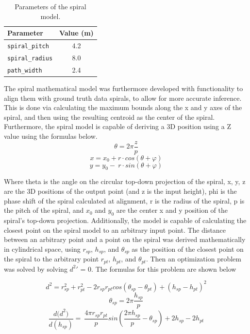 \begin{table}[h!]
\centering
\renewcommand{\arraystretch}{0.9} %
\setlength{\tabcolsep}{6pt}       %
\begin{tabular}{|l|c|}
\hline
\textbf{Parameter}       & \textbf{Value (m)} \\ \hline
\texttt{spiral\_pitch}   & 4.2               \\ \hline
\texttt{spiral\_radius}  & 8.0               \\ \hline
\texttt{path\_width}     & 2.4               \\ \hline
\end{tabular}
\vspace{-0.5em}
\caption{Parameters of the spiral model.}
\label{tab:spiral_params}
\end{table}
\par

The spiral mathematical model was furthermore developed with functionality to align them with ground truth data spirals, to allow for more accurate inference. This is done via calculating the maximum bounds along the x and y axes of the spiral, and then using the resulting centroid as the center of the spiral. Furthermore, the spiral model is capable of deriving a 3D position using a Z value using the formulas below.
$$\theta=2\pi\frac{z}{p}$$
$$x=x_0+r\cdot cos\left(\theta+\varphi\right)$$
$$y=y_0-\ r\cdot sin\left(\theta+\varphi\right)$$ 

Where theta is the angle on the circular top-down projection of the spiral, x, y, z are the 3D positions of the output point (and z is the input height), phi is the phase shift of the spiral calculated at alignment, r is the radius of the spiral, p is the pitch of the spiral, and $x_0$ and $y_0$ are the center x and y position of the spiral's top-down projection.
Additionally, the model is capable of calculating the closest point on the spiral model to an arbitrary input point. The distance between an arbitrary point and a point on the spiral was derived mathematically in cylindrical space, using $r_{sp}$, $h_{sp}$, and $\theta_{sp}$ as the position of the closest point on the spiral to the arbitrary point $r_{pt}$, $h_{pt}$, and $\theta_{pt}$. Then an optimization problem was solved by solving $d^2\prime$ = 0. The formulas for this problem are shown below

$$d^2=r_{sp}^2+r_{pt}^2-2r_{sp}r_{pt}cos\left(\theta_{sp}-\theta_{pt}\right)+\left(h_{sp}-h_{pt}\right)^2$$
$$\theta_{sp}=2\pi\frac{h_{sp}}{p}$$
$$\frac{{d(d}^2)}{d(h_{sp})}=\ \frac{4\pi r_{sp}r_{pt}}{p}sin(\frac{2\pi h_{sp}}{p}-\theta_{sp})+2h_{sp}-2h_{pt}$$

